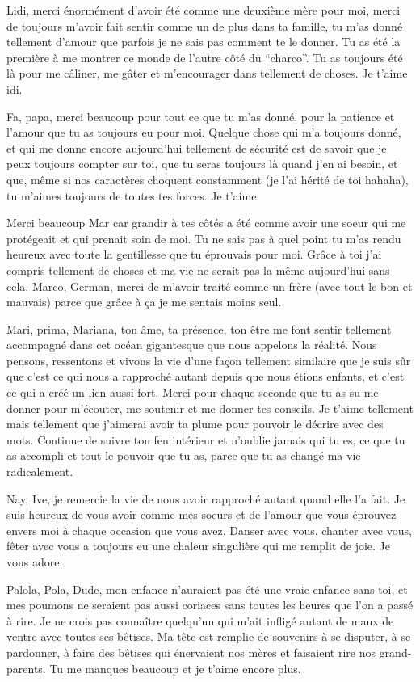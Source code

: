 Lidi, merci énormément d’avoir été comme une deuxième mère pour moi, merci de toujours m’avoir fait sentir comme un de plus dans ta famille, tu m’as donné tellement d’amour que parfois je ne sais pas comment te le donner. Tu as été la première à me montrer ce monde de l’autre côté du “charco”. Tu as toujours été là pour me câliner, me gâter et m’encourager dans tellement de choses. Je t’aime idi.

Fa, papa, merci beaucoup pour tout ce que tu m’as donné, pour la patience et l’amour que tu as toujours eu pour moi. Quelque chose qui m’a toujours donné, et qui me donne encore aujourd’hui tellement de sécurité est de savoir que je peux toujours compter sur toi, que tu seras toujours là quand j’en ai besoin, et que, même si nos caractères choquent constamment (je l’ai hérité de toi hahaha), tu m’aimes toujours de toutes tes forces. Je t’aime.

Merci beaucoup Mar car grandir à tes côtés a été comme avoir une soeur qui me protégeait et qui prenait soin de moi. Tu ne sais pas à quel point tu m’as rendu heureux avec toute la gentillesse que tu éprouvais pour moi. Grâce à toi j’ai compris tellement de choses et ma vie ne serait pas la même aujourd’hui sans cela. Marco, German, merci de m’avoir traité comme un frère (avec tout le bon et mauvais) parce que grâce à ça je me sentais moins seul.

Mari, prima, Mariana, ton âme, ta présence, ton être me font sentir tellement accompagné dans cet océan gigantesque que nous appelons la réalité. Nous pensons, ressentons et vivons la vie d’une façon tellement similaire que je suis sûr que c’est ce qui nous a rapproché autant depuis que nous étions enfants, et c’est ce qui a créé un lien aussi fort. Merci pour chaque seconde que tu as su me donner pour m’écouter, me soutenir et me donner tes conseils. Je t’aime tellement mais tellement que j’aimerai avoir ta plume pour pouvoir le décrire avec des mots. Continue de suivre ton feu intérieur et n’oublie jamais qui tu es, ce que tu as accompli et tout le pouvoir que tu as, parce que tu as changé ma vie radicalement.

Nay, Ive, je remercie la vie de nous avoir rapproché autant quand elle l’a fait. Je suis heureux de vous avoir comme mes soeurs et de l’amour que vous éprouvez envers moi à chaque occasion que vous avez. Danser avec vous, chanter avec vous, fêter avec vous a toujours eu une chaleur singulière qui me remplit de joie. Je vous adore.

Palola, Pola, Dude, mon enfance n’auraient pas été une vraie enfance sans toi, et mes poumons ne seraient pas aussi coriaces sans toutes les heures que l’on a passé à rire. Je ne crois pas connaître quelqu’un qui m’ait infligé autant de maux de ventre avec toutes ses bêtises. Ma tête est remplie de souvenirs à se disputer, à se pardonner, à faire des bêtises qui énervaient nos mères et faisaient rire nos grand-parents. Tu me manques beaucoup et je t’aime encore plus.

